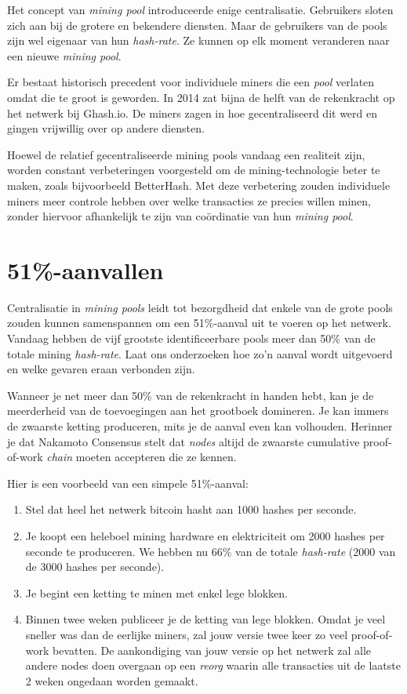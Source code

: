 \documentclass[
  letterpaper,
]{scrbook}
\begin{document}
Het concept van \emph{mining pool} introduceerde enige centralisatie.
Gebruikers sloten zich aan bij de grotere en bekendere diensten. Maar de
gebruikers van de pools zijn wel eigenaar van hun \emph{hash-rate}. Ze
kunnen op elk moment veranderen naar een nieuwe \emph{mining pool}.

Er bestaat historisch precedent voor individuele miners die een
\emph{pool} verlaten omdat die te groot is geworden. In 2014 zat bijna
de helft van de rekenkracht op het netwerk bij Ghash.io. De miners zagen
in hoe gecentraliseerd dit werd en gingen vrijwillig over op andere
diensten.

Hoewel de relatief gecentraliseerde mining pools vandaag een realiteit
zijn, worden constant verbeteringen voorgesteld om de mining-technologie
beter te maken, zoals bijvoorbeeld BetterHash. Met deze verbetering
zouden individuele miners meer controle hebben over welke transacties ze
precies willen minen, zonder hiervoor afhankelijk te zijn van
coördinatie van hun \emph{mining pool}.

\hypertarget{aanvallen}{%
\section{51\%-aanvallen}\label{aanvallen}}

Centralisatie in \emph{mining pools} leidt tot bezorgdheid dat enkele
van de grote pools zouden kunnen samenspannen om een 51\%-aanval uit te
voeren op het netwerk. Vandaag hebben de vijf grootste identificeerbare
pools meer dan 50\% van de totale mining \emph{hash-rate}. Laat ons
onderzoeken hoe zo'n aanval wordt uitgevoerd en welke gevaren eraan
verbonden zijn.

Wanneer je net meer dan 50\% van de rekenkracht in handen hebt, kan je
de meerderheid van de toevoegingen aan het grootboek domineren. Je kan
immers de zwaarste ketting produceren, mits je de aanval even kan
volhouden. Herinner je dat Nakamoto Consensus stelt dat \emph{nodes}
altijd de zwaarste cumulative proof-of-work \emph{chain} moeten
accepteren die ze kennen.

Hier is een voorbeeld van een simpele 51\%-aanval:

\begin{enumerate}
\def\labelenumi{\arabic{enumi}.}
\item
  Stel dat heel het netwerk bitcoin hasht aan 1000 hashes per seconde.
\item
  Je koopt een heleboel mining hardware en elektriciteit om 2000 hashes
  per seconde te produceren. We hebben nu 66\% van de totale
  \emph{hash-rate} (2000 van de 3000 hashes per seconde).
\item
  Je begint een ketting te minen met enkel lege blokken.
\item
  Binnen twee weken publiceer je de ketting van lege blokken. Omdat je
  veel sneller was dan de eerlijke miners, zal jouw versie twee keer zo
  veel proof-of-work bevatten. De aankondiging van jouw versie op het
  netwerk zal alle andere nodes doen overgaan op een \emph{reorg} waarin
  alle transacties uit de laatste 2 weken ongedaan worden gemaakt.
\end{enumerate}
\end{document}
